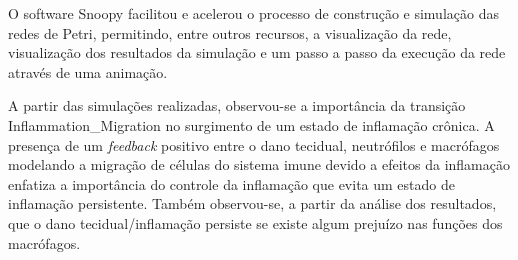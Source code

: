 \documentclass[a4paper,10pt]{article}
\begin{document}
	O software Snoopy facilitou e acelerou o processo de construç\~ao e simulaç\~ao das redes de Petri, permitindo, 
	entre outros recursos, a visualização da rede, visualização dos resultados da simulaç\~ao e um passo a passo 
	da execução da rede atrav\'es de uma animaç\~ao. 
	
	A partir das simulaç\~oes realizadas, observou-se a importância da transiç\~ao Inflammation\_Migration no 
	surgimento de um estado de inflamação cr\^onica. A presença de um \textit{feedback} positivo entre o dano 
	tecidual, neutr\'ofilos e macr\'ofagos modelando a migração de c\'elulas do sistema imune devido a efeitos 
	da inflamação enfatiza a importância do controle da inflamação que evita um estado de inflamação persistente. 
	Tamb\'em observou-se, a partir da an\'alise dos resultados, que o dano tecidual/inflamação persiste se existe 
	algum preju\'izo nas funç\~oes dos macr\'ofagos. 
	
	
		
	
		
				
\end{document}
